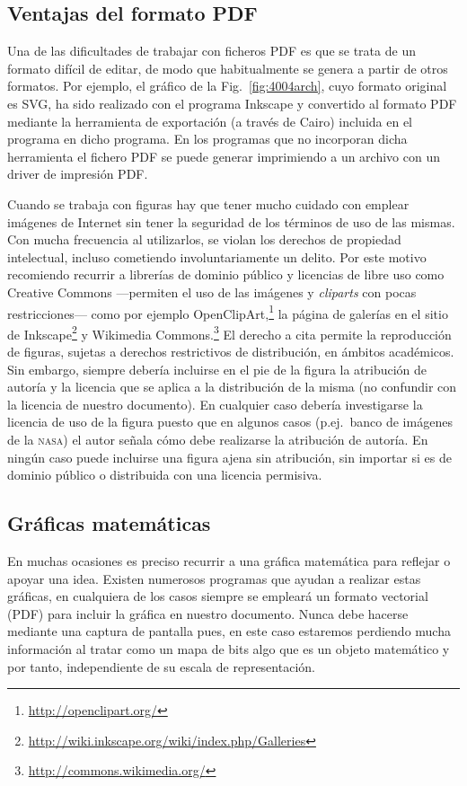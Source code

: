 \documentclass[11pt,a4paper]{article}
\begin{document}
\subsection{Ventajas del formato \textsf{PDF}}
Una de las dificultades de trabajar con ficheros \textsf{PDF} es que se trata de un formato difícil de editar, de modo que habitualmente se genera a partir de otros formatos. Por ejemplo, el gráfico de la Fig.~\ref{fig:4004arch}, cuyo formato original es \textsf{SVG}, ha sido realizado con el programa \textsf{Inkscape} y convertido al formato \textsf{PDF} mediante la herramienta de exportación (a través de \textsf{Cairo}) incluida en el programa en dicho programa. En los programas que no incorporan dicha herramienta el fichero \textsf{PDF} se puede generar imprimiendo a un archivo con un driver de impresión \textsf{PDF}. 

Cuando se trabaja con figuras hay que tener mucho cuidado con emplear imágenes de Internet sin tener la seguridad de los términos de uso de las mismas. Con mucha frecuencia al utilizarlos, se violan los derechos de propiedad intelectual, incluso cometiendo involuntariamente un delito. Por este motivo recomiendo recurrir a librerías de dominio público y licencias de libre uso como Creative Commons ---permiten el uso de las imágenes y \emph{cliparts} con pocas restricciones--- como por ejemplo OpenClipArt,\footnote{\url{http://openclipart.org/}} la página de galerías en el sitio de Inkscape\footnote{\url{http://wiki.inkscape.org/wiki/index.php/Galleries}} y Wikimedia Commons.\footnote{\url{http://commons.wikimedia.org/}} El derecho a cita permite la reproducción de figuras, sujetas a derechos restrictivos de distribución, en ámbitos académicos. Sin embargo, siempre debería incluirse en el pie de la figura la atribución de autoría y la licencia que se aplica a la distribución de la misma (no confundir con la licencia de nuestro documento). En cualquier caso debería investigarse la licencia de uso de la figura puesto que en algunos casos (p.ej.\ banco de imágenes de la \textsc{nasa}) el autor señala cómo debe realizarse la atribución de autoría. En ningún caso puede incluirse una figura ajena sin atribución, sin importar si es de dominio público o distribuida con una licencia permisiva.







\subsection{Gráficas matemáticas}
En muchas ocasiones es preciso recurrir a una gráfica matemática para reflejar o apoyar una idea. Existen numerosos programas que ayudan a realizar estas gráficas, en cualquiera de los casos siempre se empleará un formato vectorial (\textsf{PDF}) para incluir la gráfica en nuestro documento. Nunca debe hacerse mediante una captura de pantalla pues, en este caso estaremos perdiendo mucha información al tratar como un mapa de bits algo que es un objeto matemático y por tanto, independiente de su escala de representación.
\end{document}
